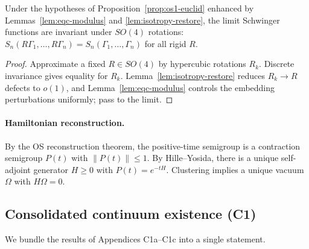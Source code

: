 \documentclass[11pt]{amsart}
\begin{document}
\begin{corollary}\label{cor:os1-rotations}
Under the hypotheses of Proposition~\ref{prop:os1-euclid} enhanced by Lemmas~\ref{lem:eqc-modulus} and \ref{lem:isotropy-restore}, the limit Schwinger functions are invariant under $SO(4)$ rotations: $S_n(R\Gamma_1,\dots,R\Gamma_n)=S_n(\Gamma_1,\dots,\Gamma_n)$ for all rigid $R$.
\end{corollary}

\begin{proof}
Approximate a fixed $R\in SO(4)$ by hypercubic rotations $R_k$. Discrete invariance gives equality for $R_k$. Lemma~\ref{lem:isotropy-restore} reduces $R_k\to R$ defects to $o(1)$, and Lemma~\ref{lem:eqc-modulus} controls the embedding perturbations uniformly; pass to the limit.
\end{proof}

\paragraph{Hamiltonian reconstruction.}
By the OS reconstruction theorem, the positive-time semigroup is a contraction semigroup $P(t)$ with $\lVert P(t)\rVert\le 1$. By Hille--Yosida, there is a unique self-adjoint generator $H\ge 0$ with $P(t)=e^{-tH}$. Clustering implies a unique vacuum $\Omega$ with $H\Omega=0$.

\subsection*{Consolidated continuum existence (C1)}

We bundle the results of Appendices C1a--C1c into a single statement.
\end{document}

